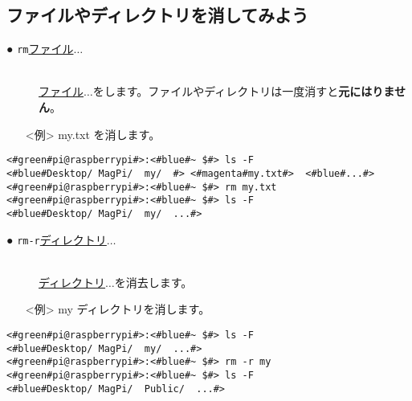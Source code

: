 \subsection{ファイルやディレクトリを消してみよう}
\begin{description}
\item[● \texttt{rm}\textvisiblespace \underline{ファイル}$\ldots$]\mbox{}\\
\underline{ファイル}$\ldots$をします。ファイルやディレクトリは一度消すと\textbf{元にはりません}。
\end{description}
\begin{itemize}
\item[<例>]my.txt を消します。
\end{itemize}
\begin{lstlisting}[caption=cpの例, label=cp]
<#green#pi@raspberrypi#>:<#blue#~ $#> ls -F
<#blue#Desktop/	MagPi/	my/	 #>	<#magenta#my.txt#>	<#blue#...#>
<#green#pi@raspberrypi#>:<#blue#~ $#> rm my.txt
<#green#pi@raspberrypi#>:<#blue#~ $#> ls -F
<#blue#Desktop/	MagPi/	my/	 ...#>
\end{lstlisting}
\begin{description}
\item[● \texttt{rm}\textvisiblespace \texttt{-r}\textvisiblespace \underline{ディレクトリ}$\ldots$]\mbox{}\\
\underline{ディレクトリ}$\ldots$を消去します。
\end{description}
\begin{itemize}
\item[<例>]my ディレクトリを消します。
\end{itemize}
\begin{lstlisting}[caption=cp -rの例, label=cp-R]
<#green#pi@raspberrypi#>:<#blue#~ $#> ls -F
<#blue#Desktop/	MagPi/	my/	 ...#>
<#green#pi@raspberrypi#>:<#blue#~ $#> rm -r my
<#green#pi@raspberrypi#>:<#blue#~ $#> ls -F
<#blue#Desktop/	MagPi/	Public/	 ...#>
\end{lstlisting}

